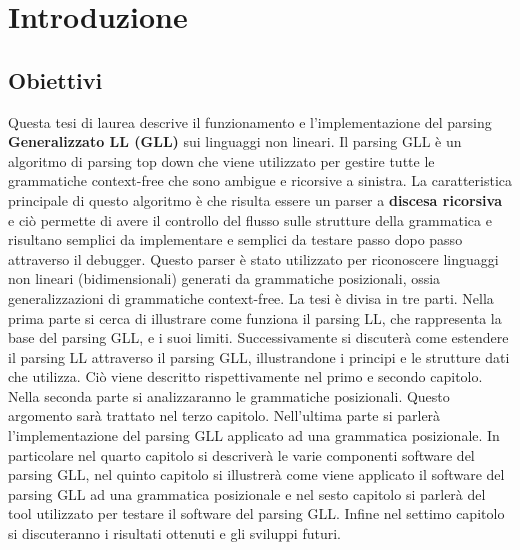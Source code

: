 \chapter{Introduzione}
\section{Obiettivi}
Questa tesi di laurea descrive il funzionamento e l'implementazione del parsing \textbf{Generalizzato LL (GLL)} sui linguaggi non lineari. Il parsing GLL è un algoritmo di parsing top down che viene utilizzato per gestire tutte le grammatiche context-free che sono ambigue e ricorsive a sinistra. La caratteristica principale di questo algoritmo è che risulta essere un parser a \textbf{discesa ricorsiva} e ciò permette di avere il controllo del flusso sulle strutture della grammatica e risultano semplici da implementare e semplici da testare passo dopo passo attraverso il debugger. Questo parser è stato utilizzato per riconoscere linguaggi non lineari (bidimensionali) generati da grammatiche posizionali, ossia generalizzazioni di grammatiche context-free. La tesi è divisa in tre parti. Nella prima parte si cerca di illustrare come funziona il parsing LL, che rappresenta la base del parsing GLL, e i suoi limiti. Successivamente si  discuterà come estendere il parsing LL attraverso il parsing GLL, illustrandone i principi e le strutture dati che utilizza. Ciò viene descritto rispettivamente nel primo e secondo capitolo. Nella seconda parte si analizzaranno le grammatiche posizionali. Questo argomento sarà trattato nel terzo capitolo. Nell'ultima parte si parlerà l'implementazione del parsing GLL applicato ad una grammatica posizionale. In particolare nel quarto capitolo si descriverà le varie  componenti software del parsing GLL, nel quinto capitolo si illustrerà come viene applicato il software del parsing GLL ad una grammatica posizionale e nel sesto capitolo si parlerà del tool utilizzato per testare il software del parsing GLL. Infine nel settimo capitolo si discuteranno i risultati ottenuti e gli sviluppi futuri.
